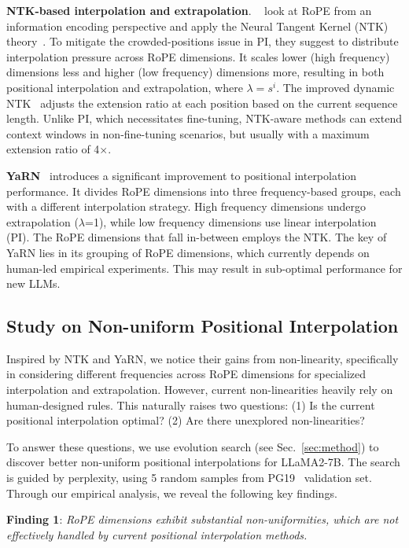 \textbf{NTK-based interpolation and extrapolation}. ~\cite{ntk,dynamicntk} look at RoPE from an information encoding perspective  and apply the Neural Tangent Kernel (NTK) theory~\cite{jacot2018neural,tancik2020fourier}. To mitigate the crowded-positions issue in PI, they suggest to distribute interpolation pressure across RoPE dimensions. It scales lower (high frequency) dimensions less and higher (low frequency) dimensions more, resulting in  both positional interpolation and extrapolation, where $\lambda=s^{i}$. The improved dynamic NTK~\cite{dynamicntk}  adjusts the extension ratio at each position based on the current sequence length. Unlike PI, which necessitates fine-tuning, NTK-aware methods can extend context windows in non-fine-tuning scenarios, but usually with a maximum extension ratio of 4$\times$. 

\textbf{YaRN}~\cite{yarn} introduces a significant improvement to positional interpolation performance. It divides RoPE dimensions into three frequency-based groups, each with a different interpolation strategy. High frequency dimensions undergo extrapolation ($\lambda$=1), while low frequency dimensions use linear interpolation (PI). The RoPE dimensions that fall in-between employs the NTK. The key of YaRN lies in its grouping of RoPE dimensions, which currently depends on human-led empirical experiments. This may result in sub-optimal performance for new LLMs. 

\subsection{Study on Non-uniform Positional Interpolation}

Inspired by NTK and YaRN, we notice their gains from non-linearity, specifically in considering different frequencies across RoPE dimensions for specialized interpolation and extrapolation. However, current non-linearities heavily rely on human-designed rules. This naturally raises two questions: (1) Is the current positional interpolation optimal? (2) Are there unexplored  non-linearities? 

To answer these questions, we use evolution search (see Sec.~\ref{sec:method}) to discover better non-uniform positional interpolations for LLaMA2-7B. The search is guided by perplexity, using 5 random samples from PG19~\cite{pg19} validation set.  Through our empirical analysis, we reveal the following key findings. 

\textbf{Finding 1}: \textit{RoPE dimensions exhibit substantial non-uniformities, which are not effectively handled by current positional interpolation methods.}

